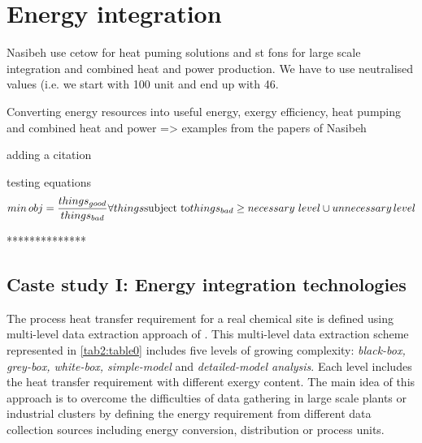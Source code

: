 \section{Energy integration}


Nasibeh use cetow for heat puming solutions and st fons for large scale integration and combined heat and power production. We have to use neutralised values (i.e. we start with 100 unit and end up with 46.


Converting energy resources into useful energy, exergy efficiency, heat pumping and combined heat and power => examples from the papers of Nasibeh

adding a citation \cite{Pouransari_2014}

testing equations
\begin{equation}
min \, obj= \frac{things_{good}}{things_{bad}} \forall things\\
\text{subject to}  \\
things_{bad}\ge necessary\,\, level \cup unnecessary \, level
\end{equation}

**************

\subsection{Caste study I: Energy integration technologies}

The process heat transfer requirement for a real chemical site is defined using multi-level data extraction approach of \cite{Pouransari_2014_2}. This multi-level data extraction scheme represented in \cref{tab2:table0} includes five levels of growing complexity: \textit{black-box, grey-box, white-box, simple-model} and \textit{detailed-model analysis}. Each level includes the heat transfer requirement with different exergy content. The main idea of this approach is to overcome the difficulties of data gathering in large scale plants or industrial clusters by defining the energy requirement from different data collection sources including energy conversion, distribution or process units.

